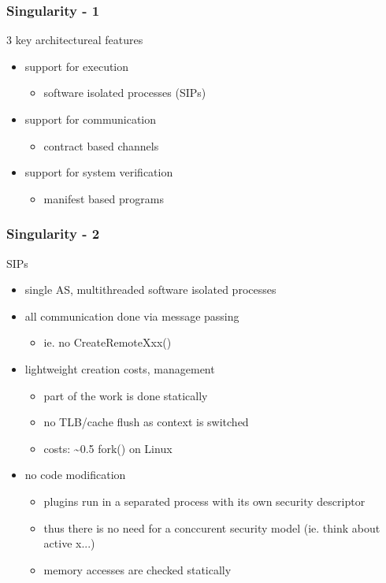 \begin{frame}
  \frametitle{Singularity - 1}
  3 key architectureal features
  \begin{itemize}
    \item support for execution
      \begin{itemize} \item software isolated processes (SIPs) \end{itemize}
    \item support for communication
      \begin{itemize} \item contract based channels \end{itemize}
    \item support for system verification
      \begin{itemize} \item manifest based programs \end{itemize}
  \end{itemize}
\end{frame}

\begin{frame}
  \frametitle{Singularity - 2}
  SIPs
  \begin{itemize}
    \item single AS, multithreaded software isolated processes
    \item all communication done via message passing
      \begin{itemize} \item ie. no CreateRemoteXxx() \end{itemize}
    \item lightweight creation costs, management
      \begin{itemize}
	\item part of the work is done statically
	\item no TLB/cache flush as context is switched
	\item costs: \textasciitilde 0.5 fork() on Linux
      \end{itemize}
    \item no code modification
      \begin{itemize}
	\item plugins run in a separated process with its own security descriptor
	\item thus there is no need for a conccurent security model (ie. think about active x...)
	\item memory accesses are checked statically
      \end{itemize}
  \end{itemize}
\end{frame}

